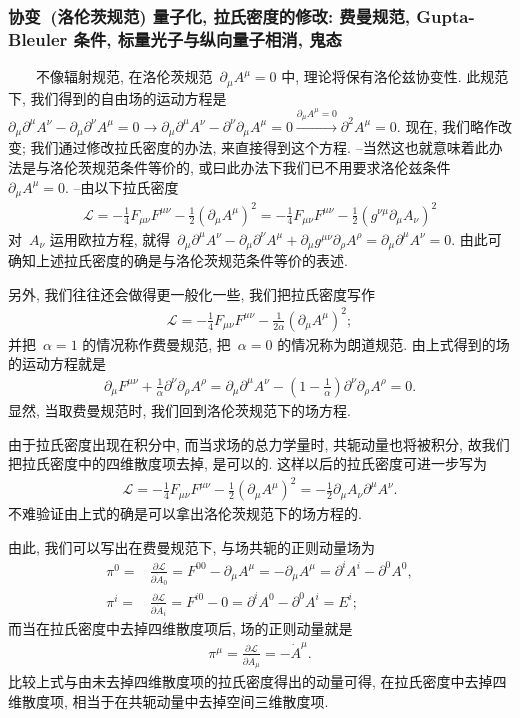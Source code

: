 \subsubsection{协变~(洛伦茨规范) 量子化, 拉氏密度的修改: 费曼规范, Gupta-Bleuler 条件, 标量光子与纵向量子相消, 鬼态}

~~~~不像辐射规范, 在洛伦茨规范~$\partial_\mu A^\mu=0$ 中, 理论将保有洛伦兹协变性. 此规范下, 我们得到的自由场的运动方程是~$\partial_\mu\partial^\mu A^\nu-\partial_\mu\partial^\nu A^\mu=0\rightarrow\partial_\mu\partial^\mu A^\nu-\partial^\nu\partial_\mu A^\mu=0\xrightarrow{\partial_\mu A^\mu=0}\partial^2 A^\mu=0$. 现在, 我们略作改变; 我们通过修改拉氏密度的办法, 来直接得到这个方程. --当然这也就意味着此办法是与洛伦茨规范条件等价的, 或曰此办法下我们已不用要求洛伦兹条件~$\partial_\mu A^\mu=0$. --由以下拉氏密度
\begin{align}
\mathcal{L}=-\frac{1}{4}F_{\mu\nu}F^{\mu\nu}-\frac{1}{2}(\partial_\mu A^\mu)^2=-\frac{1}{4}F_{\mu\nu}F^{\mu\nu}-\frac{1}{2}(g^{\nu\mu}\partial_\mu A_\nu)^2
\end{align}
对~$A_\nu$ 运用欧拉方程, 就得~$\partial_\mu\partial^\mu A^\nu-\partial_\mu\partial^\nu A^\mu+\partial_\mu g^{\mu\nu}\partial_\rho A^\rho=\partial_\mu\partial^\mu A^\nu=0$. 由此可确知上述拉氏密度的确是与洛伦茨规范条件等价的表述.

另外, 我们往往还会做得更一般化一些, 我们把拉氏密度写作
\begin{align}
\mathcal{L}=-\frac{1}{4}F_{\mu\nu}F^{\mu\nu}-\frac{1}{2\alpha}(\partial_\mu A^\mu)^2;
\end{align}
并把~$\alpha=1$ 的情况称作费曼规范, 把~$\alpha=0$ 的情况称为朗道规范. 由上式得到的场的运动方程就是
\begin{align}
\partial_\mu F^{\mu\nu}+\frac{1}{\alpha}\partial^\nu\partial_\rho A^\rho=\partial_\mu\partial^\mu A^\nu-(1-\frac{1}{\alpha})\partial^\nu\partial_\rho A^\rho=0.
\end{align}
显然, 当取费曼规范时, 我们回到洛伦茨规范下的场方程.

由于拉氏密度出现在积分中, 而当求场的总力学量时, 共轭动量也将被积分, 故我们把拉氏密度中的四维散度项去掉, 是可以的. 这样以后的拉氏密度可进一步写为
\begin{align}
\mathcal{L}=-\frac{1}{4}F_{\mu\nu}F^{\mu\nu}-\frac{1}{2}(\partial_\mu A^\mu)^2=-\frac{1}{2}\partial_\mu A_\nu\partial^\mu A^\nu.
\end{align}
不难验证由上式的确是可以拿出洛伦茨规范下的场方程的.

由此, 我们可以写出在费曼规范下, 与场共轭的正则动量场为
\begin{align}
\pi^0=&\frac{\partial\mathcal{L}}{\partial\dot{A}_0}=F^{00}-\partial_\mu A^\mu=-\partial_\mu A^\mu=\partial^iA^i-\partial^0A^0,\\
\pi^i=&\frac{\partial\mathcal{L}}{\partial\dot{A}_i}=F^{i0}-0=\partial^i A^0-\partial^0 A^i=E^i;
\end{align}
而当在拉氏密度中去掉四维散度项后, 场的正则动量就是
\begin{align}
\pi^\mu=\frac{\partial\mathcal{L}}{\partial\dot{A}_\mu}=-\dot{A}^\mu.
\end{align}
比较上式与由未去掉四维散度项的拉氏密度得出的动量可得, 在拉氏密度中去掉四维散度项, 相当于在共轭动量中去掉空间三维散度项.

